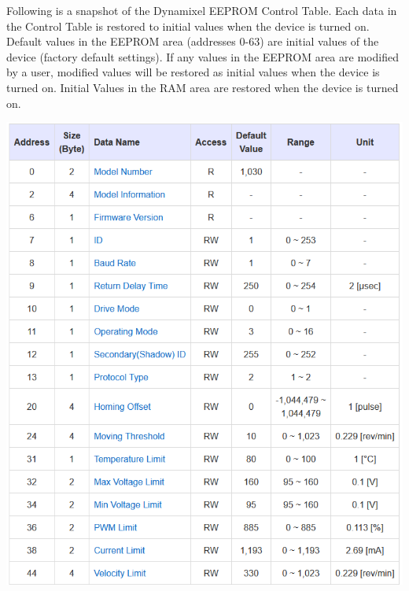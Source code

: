 \documentclass[12]{article}
\begin{document}
Following is a snapshot of the Dynamixel EEPROM Control Table. Each data in the Control Table is restored to initial values when the device is turned on. Default values in the EEPROM area (addresses 0-63) are initial values of the device (factory default settings). If any values in the EEPROM area are modified by a user, modified values will be restored as initial values when the device is turned on. Initial Values in the RAM area are restored when the device is turned on.

\begin{center}
	\includegraphics[width=0.7\linewidth]{images/dxl_eeprom.png}\\
\end{center}
\end{document}
